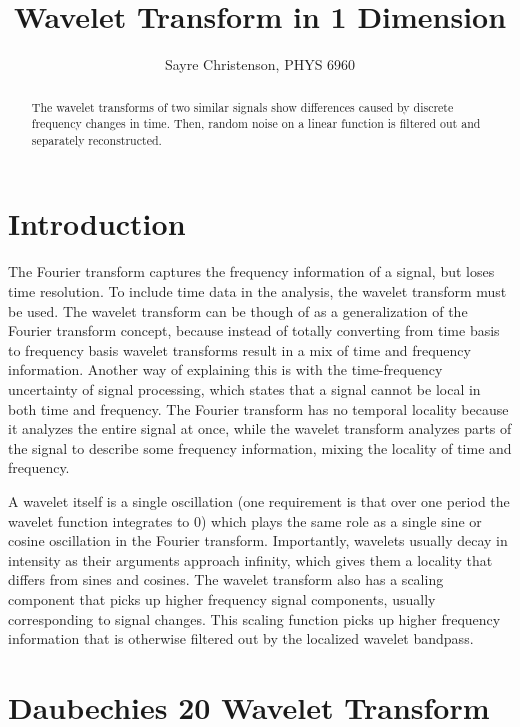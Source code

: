 \documentclass[12pt]{article}
\begin{document}
\title{Wavelet Transform in 1 Dimension}
\author{Sayre Christenson, PHYS 6960}
\date{}

\maketitle


\begin{abstract}

The wavelet transforms of two similar signals show differences caused by discrete frequency changes in time.
Then, random noise on a linear function is filtered out and separately reconstructed.

\end{abstract}



\section*{Introduction}

The Fourier transform captures the frequency information of a signal, but loses time resolution.
To include time data in the analysis, the wavelet transform must be used.
The wavelet transform can be though of as a generalization of the Fourier transform concept, because instead of totally converting from time basis to frequency basis wavelet transforms result in a mix of time and frequency information.
Another way of explaining this is with the time-frequency uncertainty of signal processing, which states that a signal cannot be local in both time and frequency.
The Fourier transform has no temporal locality because it analyzes the entire signal at once, while the wavelet transform analyzes parts of the signal to describe some frequency information, mixing the locality of time and frequency.

A wavelet itself is a single oscillation (one requirement is that over one period the wavelet function integrates to 0) which plays the same role as a single sine or cosine oscillation in the Fourier transform.
Importantly, wavelets usually decay in intensity as their arguments approach infinity, which gives them a locality that differs from sines and cosines.
The wavelet transform also has a scaling component that picks up higher frequency signal components, usually corresponding to signal changes.
This scaling function picks up higher frequency information that is otherwise filtered out by the localized wavelet bandpass.

\section*{Daubechies 20 Wavelet Transform}
\end{document}

